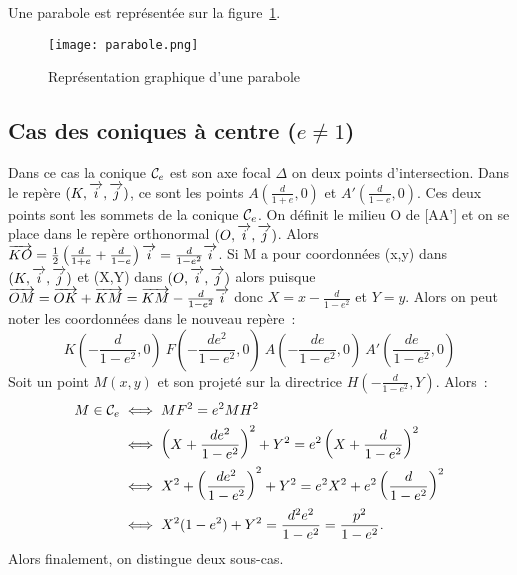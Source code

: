 Une parabole est représentée sur la figure~\ref{fig:parabole}.

\begin{figure}[!h]
  \centering
  \texttt{[image: parabole.png]}
  \caption{Représentation graphique d'une parabole}
  \label{fig:parabole}
\end{figure}


\subsection{Cas des coniques à centre ($e\neq 1$)}
Dans ce cas la conique $\mathcal{C}_{e}$ est son axe focal $\Delta$ on deux points d'intersection. Dans le repère $(K,\overrightarrow{i},\overrightarrow{j})$, ce sont les points $A(\frac{d}{1+e},0)$ et $A'(\frac{d}{1-e},0)$. Ces deux points sont les sommets de la conique $\mathcal{C}_{e}$. On définit le milieu O de [AA'] et on se place dans le repère orthonormal $(O,\overrightarrow{i},\overrightarrow{j})$. Alors $\overrightarrow{KO}=\frac{1}{2}\left(\frac{d}{1+e}+\frac{d}{1-e}\right)\overrightarrow{i}=\frac{d}{1-e^2}\overrightarrow{i}$. Si M a pour coordonnées (x,y) dans $(K,\overrightarrow{i},\overrightarrow{j})$ et (X,Y) dans $(O,\overrightarrow{i},\overrightarrow{j})$ alors puisque $\overrightarrow{OM}=\overrightarrow{OK}+\overrightarrow{KM}=\overrightarrow{KM}-\frac{d}{1-e^2}\overrightarrow{i}$ donc $X=x-\frac{d}{1-e^2}$ et $Y=y$. Alors on peut noter les coordonnées dans le nouveau repère~:
\begin{equation}
  K\left(-\frac{d}{1-e^2},0\right) \ F\left(-\frac{de^2}{1-e^2},0\right) \ A\left(-\frac{de}{1-e^2},0\right) \ A'\left(\frac{de}{1-e^2},0\right)
\end{equation}
Soit un point $M(x,y)$ et son projeté sur la directrice $H\left(-\frac{d}{1-e^2},Y\right)$. Alors~:
\begin{align}
  M \in \mathcal{C}_{e} &\iff MF^2=e^2 MH^2\\
  &\iff \left(X+\frac{de^2}{1-e^2}\right)^2+Y^2=e^2 \left(X+\frac{d}{1-e^2}\right)^2\\
  &\iff X^2+\left(\frac{de^2}{1-e^2}\right)^2+Y^2=e^2 X^2+e^2\left(\frac{d}{1-e^2}\right)^2\\
&\iff X^2(1-e^2)+Y^2=\frac{d^2e^2}{1-e^2}=\frac{p^2}{1-e^2}.
\end{align}
Alors finalement, on distingue deux sous-cas.

